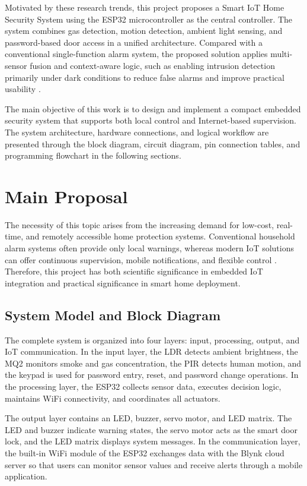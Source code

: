 \documentclass[conference]{IEEEtran}
\begin{document}
Motivated by these research trends, this project proposes a Smart IoT Home Security System using the ESP32 microcontroller as the central controller. The system combines gas detection, motion detection, ambient light sensing, and password-based door access in a unified architecture. Compared with a conventional single-function alarm system, the proposed solution applies multi-sensor fusion and context-aware logic, such as enabling intrusion detection primarily under dark conditions to reduce false alarms and improve practical usability \cite{gunawan2018performance,stojkoska2017review}.

The main objective of this work is to design and implement a compact embedded security system that supports both local control and Internet-based supervision. The system architecture, hardware connections, and logical workflow are presented through the block diagram, circuit diagram, pin connection tables, and programming flowchart in the following sections.

\section{Main Proposal}
The necessity of this topic arises from the increasing demand for low-cost, real-time, and remotely accessible home protection systems. Conventional household alarm systems often provide only local warnings, whereas modern IoT solutions can offer continuous supervision, mobile notifications, and flexible control \cite{taiwo2021internet,al2020smart}. Therefore, this project has both scientific significance in embedded IoT integration and practical significance in smart home deployment.

\subsection{System Model and Block Diagram}
The complete system is organized into four layers: input, processing, output, and IoT communication. In the input layer, the LDR detects ambient brightness, the MQ2 monitors smoke and gas concentration, the PIR detects human motion, and the keypad is used for password entry, reset, and password change operations. In the processing layer, the ESP32 collects sensor data, executes decision logic, maintains WiFi connectivity, and coordinates all actuators.

The output layer contains an LED, buzzer, servo motor, and LED matrix. The LED and buzzer indicate warning states, the servo motor acts as the smart door lock, and the LED matrix displays system messages. In the communication layer, the built-in WiFi module of the ESP32 exchanges data with the Blynk cloud server so that users can monitor sensor values and receive alerts through a mobile application.
\end{document}
